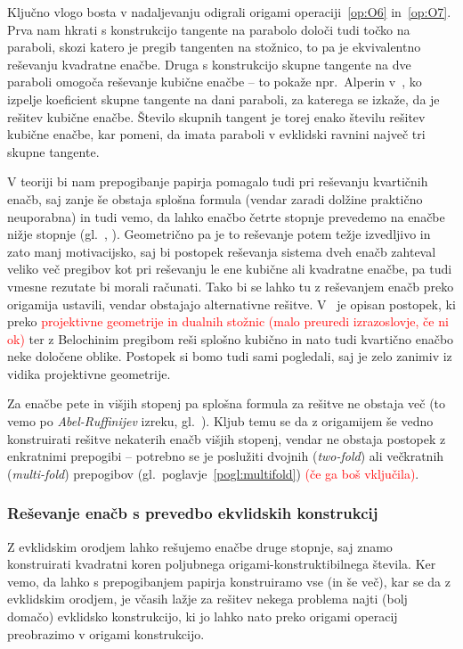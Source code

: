 Ključno vlogo bosta v nadaljevanju odigrali origami operaciji~\ref{op:O6} in~\ref{op:O7}. Prva nam hkrati s konstrukcijo tangente na parabolo določi tudi točko na paraboli, skozi katero je pregib tangenten na stožnico, to pa je ekvivalentno reševanju kvadratne enačbe. Druga s konstrukcijo skupne tangente na dve paraboli omogoča reševanje kubične enačbe -- to pokaže npr.\ Alperin v~\cite[str.\ 129]{alperin2000}, ko izpelje koeficient skupne tangente na dani paraboli, za katerega se izkaže, da je rešitev kubične enačbe. Število skupnih tangent je torej enako številu rešitev kubične enačbe, kar pomeni, da imata paraboli v evklidski ravnini največ tri skupne tangente.

V teoriji bi nam prepogibanje papirja pomagalo tudi pri reševanju kvartičnih enačb, saj zanje še obstaja splošna formula (vendar zaradi dolžine praktično neuporabna) in tudi vemo, da lahko enačbo četrte stopnje prevedemo na enačbe nižje stopnje (gl.\ \cite{wikiquartic}, \cite{quartics2012}). Geometrično pa je to reševanje potem težje izvedljivo in zato manj motivacijsko, saj bi postopek reševanja sistema dveh enačb zahteval veliko več pregibov kot pri reševanju le ene kubične ali kvadratne enačbe, pa tudi vmesne rezutate bi morali računati. Tako bi se lahko tu z reševanjem enačb preko origamija ustavili, vendar obstajajo alternativne rešitve. V~\cite{edwards2001} je opisan postopek, ki preko \textcolor{red}{projektivne geometrije in dualnih stožnic (malo preuredi izrazoslovje, če ni ok)} ter z Belochinim pregibom reši splošno kubično in nato tudi kvartično enačbo neke določene oblike. Postopek si bomo tudi sami pogledali, saj je zelo zanimiv iz vidika projektivne geometrije.

Za enačbe pete in višjih stopenj pa splošna formula za rešitve ne obstaja več (to vemo po \emph{Abel-Ruffinijev} izreku, gl.\ \cite{mrinal2019}). Kljub temu se da z origamijem še vedno konstruirati rešitve nekaterih enačb višjih stopenj, vendar ne obstaja postopek z enkratnimi prepogibi -- potrebno se je poslužiti dvojnih (\emph{two-fold}) ali večkratnih (\emph{multi-fold}) prepogibov (gl.\ poglavje~\ref{pogl:multifold}) \textcolor{red}{(če ga boš vključila)}.

\subsubsection*{Reševanje enačb s prevedbo ekvlidskih konstrukcij}

Z evklidskim orodjem lahko rešujemo enačbe druge stopnje, saj znamo konstruirati kvadratni koren poljubnega origami-konstruktibilnega števila. Ker vemo, da lahko s prepogibanjem papirja konstruiramo vse (in še več), kar se da z evklidskim orodjem, je včasih lažje za rešitev nekega problema najti (bolj domačo) evklidsko konstrukcijo, ki jo lahko nato preko origami operacij preobrazimo v origami konstrukcijo.

